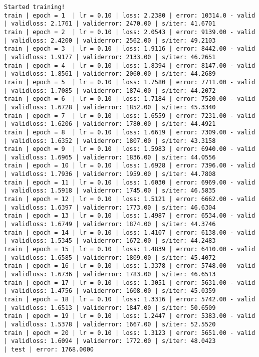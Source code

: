\documentclass{article}
\begin{document}
\begin{itemize}
\begin{landscape}
\begin{itemize}
\begin{Verbatim}[fontsize=\small]
Started training!	
train | epoch = 1  | lr = 0.10 | loss: 2.2380 | error: 10314.0 - valid | validloss: 2.1761 | validerror: 2470.00 | s/iter: 41.6701	
train | epoch = 2  | lr = 0.10 | loss: 2.0543 | error: 9139.00 - valid | validloss: 2.4200 | validerror: 2562.00 | s/iter: 49.2103	
train | epoch = 3  | lr = 0.10 | loss: 1.9116 | error: 8442.00 - valid | validloss: 1.9177 | validerror: 2133.00 | s/iter: 46.2651	
train | epoch = 4  | lr = 0.10 | loss: 1.8394 | error: 8147.00 - valid | validloss: 1.8561 | validerror: 2060.00 | s/iter: 44.2689	
train | epoch = 5  | lr = 0.10 | loss: 1.7580 | error: 7711.00 - valid | validloss: 1.7085 | validerror: 1874.00 | s/iter: 44.2072	
train | epoch = 6  | lr = 0.10 | loss: 1.7184 | error: 7520.00 - valid | validloss: 1.6728 | validerror: 1852.00 | s/iter: 45.3340	
train | epoch = 7  | lr = 0.10 | loss: 1.6559 | error: 7231.00 - valid | validloss: 1.6206 | validerror: 1780.00 | s/iter: 44.4921	
train | epoch = 8  | lr = 0.10 | loss: 1.6619 | error: 7309.00 - valid | validloss: 1.6352 | validerror: 1807.00 | s/iter: 43.3158	
train | epoch = 9  | lr = 0.10 | loss: 1.5983 | error: 6940.00 - valid | validloss: 1.6965 | validerror: 1836.00 | s/iter: 44.0556	
train | epoch = 10 | lr = 0.10 | loss: 1.6928 | error: 7396.00 - valid | validloss: 1.7936 | validerror: 1959.00 | s/iter: 44.7808	
train | epoch = 11 | lr = 0.10 | loss: 1.6030 | error: 6969.00 - valid | validloss: 1.5918 | validerror: 1745.00 | s/iter: 46.5835	
train | epoch = 12 | lr = 0.10 | loss: 1.5121 | error: 6662.00 - valid | validloss: 1.6397 | validerror: 1773.00 | s/iter: 46.6304	
train | epoch = 13 | lr = 0.10 | loss: 1.4987 | error: 6534.00 - valid | validloss: 1.6749 | validerror: 1874.00 | s/iter: 44.3746	
train | epoch = 14 | lr = 0.10 | loss: 1.4107 | error: 6138.00 - valid | validloss: 1.5345 | validerror: 1672.00 | s/iter: 44.2483	
train | epoch = 15 | lr = 0.10 | loss: 1.4839 | error: 6410.00 - valid | validloss: 1.6585 | validerror: 1809.00 | s/iter: 45.4072	
train | epoch = 16 | lr = 0.10 | loss: 1.3378 | error: 5748.00 - valid | validloss: 1.6736 | validerror: 1783.00 | s/iter: 46.6513	
train | epoch = 17 | lr = 0.10 | loss: 1.3051 | error: 5631.00 - valid | validloss: 1.4756 | validerror: 1608.00 | s/iter: 45.0359	
train | epoch = 18 | lr = 0.10 | loss: 1.3316 | error: 5742.00 - valid | validloss: 1.6513 | validerror: 1847.00 | s/iter: 50.6509	
train | epoch = 19 | lr = 0.10 | loss: 1.2447 | error: 5383.00 - valid | validloss: 1.5378 | validerror: 1667.00 | s/iter: 52.5520	
train | epoch = 20 | lr = 0.10 | loss: 1.3123 | error: 5651.00 - valid | validloss: 1.6094 | validerror: 1772.00 | s/iter: 48.0423	
| test | error: 1768.0000


\end{Verbatim}
\end{itemize}
\end{landscape}
\end{itemize}
\end{document}
